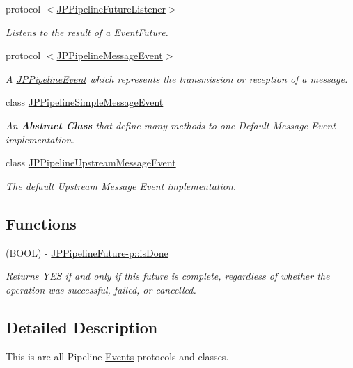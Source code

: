 \begin{DoxyCompactItemize}
protocol \hyperlink{a00021}{$<$JPPipelineFutureListener$>$}
\begin{DoxyCompactList}\small\item\em Listens to the result of a EventFuture. \item\end{DoxyCompactList}\item 
protocol \hyperlink{a00026}{$<$JPPipelineMessageEvent$>$}
\begin{DoxyCompactList}\small\item\em A \hyperlink{a00016}{JPPipelineEvent} which represents the transmission or reception of a message. \item\end{DoxyCompactList}\item 
class \hyperlink{a00028}{JPPipelineSimpleMessageEvent}
\begin{DoxyCompactList}\small\item\em An {\bfseries Abstract Class} that define many methods to one Default Message Event implementation. \item\end{DoxyCompactList}\item 
class \hyperlink{a00031}{JPPipelineUpstreamMessageEvent}
\begin{DoxyCompactList}\small\item\em The default Upstream Message Event implementation. \item\end{DoxyCompactList}\end{DoxyCompactItemize}
\subsection*{Functions}
\begin{DoxyCompactItemize}
\item 
\hypertarget{a00079_ga41065d3dada7633eef9dd75b1794511b}{
(BOOL) -\/ \hyperlink{a00079_ga41065d3dada7633eef9dd75b1794511b}{JPPipelineFuture-\/p::isDone}}
\label{a00079_ga41065d3dada7633eef9dd75b1794511b}

\begin{DoxyCompactList}\small\item\em Returns YES if and only if this future is complete, regardless of whether the operation was successful, failed, or cancelled. \item\end{DoxyCompactList}\end{DoxyCompactItemize}


\subsection{Detailed Description}
This is are all Pipeline \hyperlink{a00004}{Events} protocols and classes. 